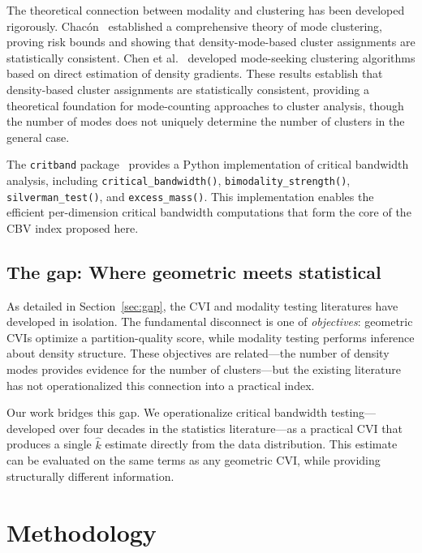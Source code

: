 \documentclass[journal]{IEEEtran}
\begin{document}
The theoretical connection between modality and clustering has been developed rigorously. Chac\'on~\cite{chacon2015population} established a comprehensive theory of mode clustering, proving risk bounds and showing that density-mode-based cluster assignments are statistically consistent. Chen et al.~\cite{chen2017density, chen2017mode} developed mode-seeking clustering algorithms based on direct estimation of density gradients. These results establish that density-based cluster assignments are statistically consistent, providing a theoretical foundation for mode-counting approaches to cluster analysis, though the number of modes does not uniquely determine the number of clusters in the general case.

The \texttt{critband} package~\cite{zhang2026critband, critband2025} provides a Python implementation of critical bandwidth analysis, including \texttt{critical\_bandwidth()}, \texttt{bimodality\_strength()}, \texttt{silverman\_test()}, and \texttt{excess\_mass()}. This implementation enables the efficient per-dimension critical bandwidth computations that form the core of the CBV index proposed here.

\subsection{The gap: Where geometric meets statistical}
\label{sec:where-geometric-meets-statistical}

As detailed in Section~\ref{sec:gap}, the CVI and modality testing literatures have developed in isolation. The fundamental disconnect is one of \emph{objectives}: geometric CVIs optimize a partition-quality score, while modality testing performs inference about density structure. These objectives are related---the number of density modes provides evidence for the number of clusters---but the existing literature has not operationalized this connection into a practical index.

Our work bridges this gap. We operationalize critical bandwidth testing---developed over four decades in the statistics literature---as a practical CVI that produces a single $\hat{k}$ estimate directly from the data distribution. This estimate can be evaluated on the same terms as any geometric CVI, while providing structurally different information.

\section{Methodology}
\label{sec:methodology}
\end{document}
